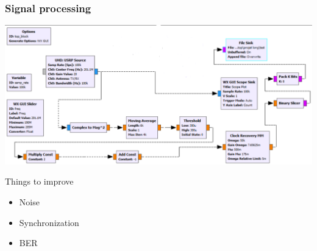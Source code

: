 \begin{frame}
	\frametitle{Signal processing}
	\centering \includegraphics[scale=.35]{images/flaw.png}
	\begin{block}{Things to improve}
		\begin{itemize}
			\item Noise
			\item Synchronization
			\item BER
		\end{itemize}
	\end{block}
\end{frame}

